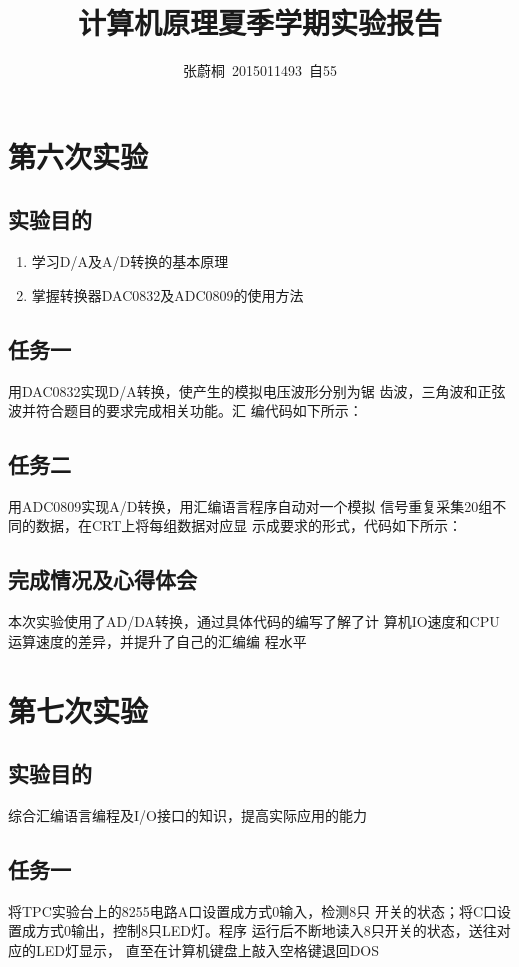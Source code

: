 \documentclass[UTF8,a4paper]{paper}
\title{计算机原理夏季学期实验报告}
\author{张蔚桐\ 2015011493\ 自55}
\begin{document}
\maketitle
\section{第六次实验}
\subsection{实验目的}
\begin{enumerate}
    \item 学习D/A及A/D转换的基本原理
    \item 掌握转换器DAC0832及ADC0809的使用方法
\end{enumerate}
\subsection{任务一}
用DAC0832实现D/A转换，使产生的模拟电压波形分别为锯
齿波，三角波和正弦波并符合题目的要求完成相关功能。汇
编代码如下所示：\\ 

\subsection{任务二}
用ADC0809实现A/D转换，用汇编语言程序自动对一个模拟
信号重复采集20组不同的数据，在CRT上将每组数据对应显
示成要求的形式，代码如下所示：\\ 

\subsection{完成情况及心得体会}
本次实验使用了AD/DA转换，通过具体代码的编写了解了计
算机IO速度和CPU运算速度的差异，并提升了自己的汇编编
程水平
\section{第七次实验}
\subsection{实验目的}
综合汇编语言编程及I/O接口的知识，提高实际应用的能力
\subsection{任务一}
将TPC实验台上的8255电路A口设置成方式0输入，检测8只
开关的状态；将C口设置成方式0输出，控制8只LED灯。程序
运行后不断地读入8只开关的状态，送往对应的LED灯显示，
直至在计算机键盘上敲入空格键退回DOS
\end{document}
